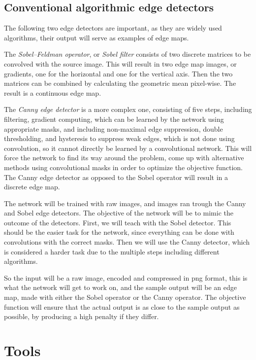 \documentclass[12pt]{report}
\begin{document}
\subsection{Conventional algorithmic edge detectors}
The following two edge detectors are important, as they are widely used algorithms, their output will serve as examples of edge maps.\\\par
The \textit{Sobel–Feldman operator}, or \textit{Sobel filter} consists of two discrete matrices to be convolved with the source image. This will result in two edge map images, or gradients, one for the horizontal and one for the vertical axis. Then the two matrices can be combined by calculating the geometric mean pixel-wise. The result is a continuous edge map.\\\par
The \textit{Canny edge detector} is a more complex one, consisting of five steps, including filtering, gradient computing, which can be learned by the network using appropriate masks, and including non-maximal edge suppression, double thresholding, and hysteresis to suppress weak edges, which is not done using convolution, so it cannot directly be learned by a convolutional network. This will force the network to find its way around the problem, come up with alternative methods using convolutional masks in order to optimize the objective function. The Canny edge detector as opposed to the Sobel operator will result in a discrete edge map.\\\par
The network will be trained with raw images, and images ran trough the Canny and Sobel edge detectors. The objective of the network will be to mimic the outcome of the detectors. First, we will teach with the Sobel detector. This should be the easier task for the network, since everything can be done with convolutions with the correct masks. Then we will use the Canny detector, which is considered a harder task due to the multiple steps including different algorithms.\par
So the input will be a raw image, encoded and compressed in png format, this is what the network will get to work on, and the sample output will be an edge map, made with either the Sobel operator or the Canny operator. The objective function will ensure that the actual output is as close to the sample output as possible, by producing a high penalty if they differ.
\section{Tools}
\end{document}
